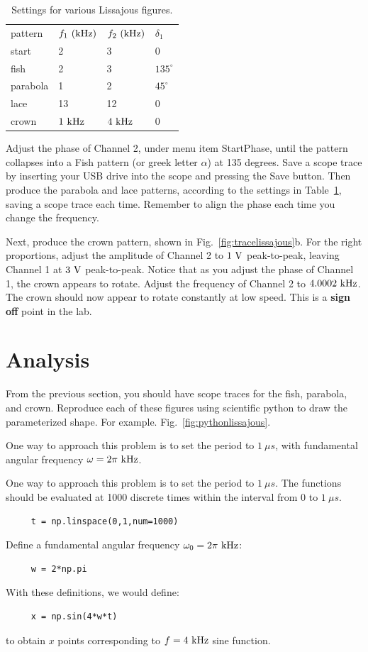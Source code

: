 \begin{table}
\begin{center}
\caption{Settings for various Lissajous figures.}
\label{tbl:lissajous}
\begin{tabular}{llll}
pattern & $f_1~\rm(kHz)$ & $f_2~\rm(kHz)$ & $\delta_1$ \\
start & 2 & 3 & 0 \\
fish & 2 & 3 & $135^\circ$ \\
parabola & 1 & 2 & $45^\circ$ \\
lace & 13 & 12 & 0 \\
crown & $1~\rm kHz$ & $4~\rm kHz$ & 0 \\
\end{tabular}
\end{center}
\end{table}

Adjust the phase of Channel 2, under menu item StartPhase, until the
pattern collapses into a Fish pattern (or greek letter $\alpha$) at
135 degrees.  Save a scope trace by inserting your USB drive into the
scope and pressing the Save button.  Then produce the parabola and
lace patterns, according to the settings in Table~\ref{tbl:lissajous}, saving a scope
trace each time.  Remember to align the phase each time you change the
frequency.

Next, produce the crown pattern, shown in Fig.~\ref{fig:tracelissajous}b.
For the right proportions, adjust the amplitude of
Channel 2 to $1~\rm V$ peak-to-peak, leaving Channel 1 at $3~\rm V$
peak-to-peak.  Notice that as you adjust the phase of Channel 1, the
crown appears to rotate.  Adjust the frequency of Channel 2 to
$4.0002~\rm kHz$.  The crown should now appear to rotate constantly at
low speed.  This is a {\bf sign off} point in the lab.

\section{Analysis}

From the previous section, you should have scope traces for the fish,
parabola, and crown.  Reproduce each of these figures using scientific
python to draw the parameterized shape.  For
example. Fig.~\ref{fig:pythonlissajous}.

One way to approach this problem is to set the period to $1~\mu s$,
with fundamental angular frequency $\omega = 2 \pi~\rm kHz$.

One way to approach this problem is to set the period to $1~\mu s$.
The functions should be evaluated at 1000 discrete times within the
interval from 0 to $1~\mu s$.
\begin{verbatim}
     t = np.linspace(0,1,num=1000)
\end{verbatim}
Define a fundamental angular frequency $\omega_0 = 2 \pi~\rm kHz$:
\begin{verbatim}
     w = 2*np.pi
\end{verbatim}
With these definitions, we would define:
\begin{verbatim}
     x = np.sin(4*w*t)
\end{verbatim}
to obtain $x$ points corresponding to $f=4~\rm kHz$ sine function.

